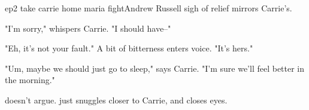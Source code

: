 \documentclass{book}
\begin{document}
\begin{childnode}{ep2 take carrie home maria fight}{Andrew Russell}
    \names{} sigh of relief mirrors Carrie's.

    "I'm sorry," whispers Carrie. "I should have--"

    "Eh, it's not your fault." A bit of bitterness enters \names{} voice. "It's hers."

    "Um, maybe we should just go to sleep," says Carrie. "I'm sure we'll feel better in the morning."

    \name{} doesn't argue. \HeShe{} just snuggles closer to Carrie, and closes \hisher{} eyes.




\end{childnode}
\end{document}
